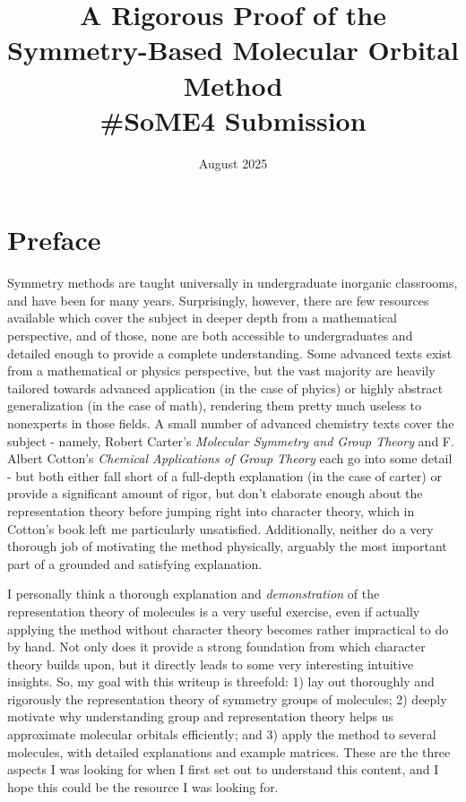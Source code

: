 \documentclass{article}
\title{A Rigorous Proof of the Symmetry-Based Molecular Orbital Method \\ \large \#SoME4 Submission}
\date{August 2025}
\begin{document}
\maketitle

\section{Preface}
Symmetry methods are taught universally in undergraduate inorganic classrooms, and have been for many years. Surprisingly, however, there are few resources available which cover the subject in deeper depth from a mathematical perspective, and of those, none are both accessible to undergraduates and detailed enough to provide a complete understanding. Some advanced texts exist from a mathematical or physics perspective, but the vast majority are heavily tailored towards advanced application (in the case of phyics) or highly abstract generalization (in the case of math), rendering them pretty much useless to nonexperts in those fields. A small number of advanced chemistry texts cover the subject - namely, Robert Carter's \textit{Molecular Symmetry and Group Theory} and F. Albert Cotton's \textit{Chemical Applications of Group Theory} each go into some detail - but both either fall short of a full-depth explanation (in the case of carter) or provide a significant amount of rigor, but don't elaborate enough about the representation theory before jumping right into character theory, which in Cotton's book left me particularly unsatisfied. Additionally, neither do a very thorough job of motivating the method physically, arguably the most important part of a grounded and satisfying explanation. 

I personally think a thorough explanation and \textit{demonstration} of the representation theory of molecules is a very useful exercise, even if actually applying the method without character theory becomes rather impractical to do by hand. Not only does it provide a strong foundation from which character theory builds upon, but it directly leads to some very interesting intuitive insights. So, my goal with this writeup is threefold: 1) lay out thoroughly and rigorously the representation theory of symmetry groups of molecules; 2) deeply motivate why understanding group and representation theory helps us approximate molecular orbitals efficiently; and 3) apply the method to several molecules, with detailed explanations and example matrices. These are the three aspects I was looking for when I first set out to understand this content, and I hope this could be the resource I was looking for.
\end{document}
